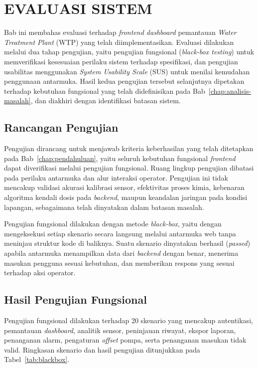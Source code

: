 \cleardoublepage
\chapter{EVALUASI SISTEM}
\label{chap:evaluasi-sistem}

Bab ini membahas evaluasi terhadap \textit{frontend dashboard} pemantauan \textit{Water Treatment Plant} (WTP) 
yang telah diimplementasikan. Evaluasi dilakukan melalui dua tahap pengujian, yaitu pengujian fungsional 
(\textit{black-box testing}) untuk memverifikasi kesesuaian perilaku sistem terhadap spesifikasi, dan pengujian 
usabilitas menggunakan \textit{System Usability Scale} (SUS) untuk menilai kemudahan penggunaan antarmuka. 
Hasil kedua pengujian tersebut selanjutnya dipetakan terhadap kebutuhan fungsional yang telah didefinisikan 
pada Bab~\ref{chap:analisis-masalah}, dan diakhiri dengan identifikasi batasan sistem.

\section{Rancangan Pengujian}
Pengujian dirancang untuk menjawab kriteria keberhasilan yang telah ditetapkan pada Bab~\ref{chap:pendahuluan}, 
yaitu seluruh kebutuhan fungsional \textit{frontend} dapat diverifikasi melalui pengujian fungsional. Ruang lingkup 
pengujian dibatasi pada perilaku antarmuka dan alur interaksi operator. Pengujian ini tidak mencakup validasi akurasi 
kalibrasi sensor, efektivitas proses kimia, kebenaran algoritma kendali dosis pada \textit{backend}, maupun keandalan 
jaringan pada kondisi lapangan, sebagaimana telah dinyatakan dalam batasan masalah.

Pengujian fungsional dilakukan dengan metode \textit{black-box}, yaitu dengan mengeksekusi setiap skenario secara 
langsung melalui antarmuka web tanpa meninjau struktur kode di baliknya. Suatu skenario dinyatakan berhasil 
(\textit{passed}) apabila antarmuka menampilkan data dari \textit{backend} dengan benar, menerima masukan pengguna 
sesuai kebutuhan, dan memberikan respons yang sesuai terhadap aksi operator.

\section{Hasil Pengujian Fungsional}
Pengujian fungsional dilakukan terhadap 20 skenario yang mencakup autentikasi, pemantauan \textit{dashboard}, 
analitik sensor, peninjauan riwayat, ekspor laporan, penanganan alarm, pengaturan \textit{offset} pompa, serta 
penanganan masukan tidak valid. Ringkasan skenario dan hasil pengujian ditunjukkan pada Tabel~\ref{tab:blackbox}.


